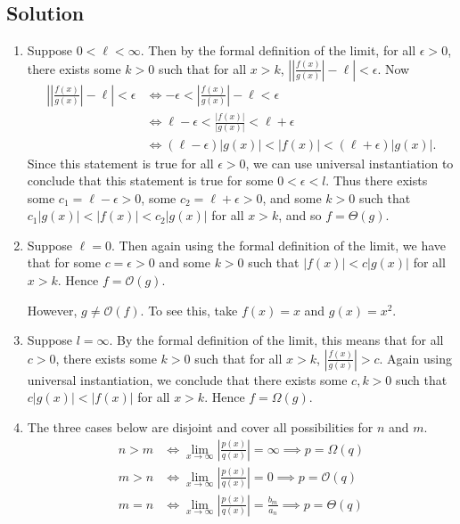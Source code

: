 \documentclass{article}
\begin{document}
\subsection*{Solution}
    \begin{enumerate}
        \item Suppose $0 < \ell < \infty$. Then by the formal definition of the limit, for all $\epsilon > 0$, there exists some $k > 0$ such that for all $x > k$, $\left|\left|\frac{f(x)}{g(x)}\right| - \ell\right| < \epsilon$. Now
        \begin{align*}
            \left|\left|\frac{f(x)}{g(x)}\right| - \ell\right| < \epsilon &\iff - \epsilon < \left|\frac{f(x)}{g(x)}\right| - \ell < \epsilon \\
            &\iff \ell - \epsilon < \frac{|f(x)|}{|g(x)|} < \ell + \epsilon \\
            &\iff (\ell - \epsilon)\left|g(x)\right| < \left|f(x)\right| < (\ell + \epsilon)\left|g(x)\right|.
        \end{align*}
        Since this statement is true for all $\epsilon > 0$, we can use universal instantiation to conclude that this statement is true for some $0 < \epsilon < l$. Thus there exists some $c_{1} = \ell - \epsilon > 0$, some $c_{2} = \ell + \epsilon > 0$, and some $k > 0$ such that $c_{1}|g(x)| < |f(x)| < c_{2}|g(x)|$ for all $x > k$, and so $f = \Theta(g)$.
        \item Suppose $\ell = 0$. Then again using the formal definition of the limit, we have that for some $c = \epsilon > 0$ and some $k > 0$ such that $|f(x)| < c|g(x)|$ for all $x > k$. Hence $f = \mathcal{O}(g)$.
        
        \vspace{1.5mm}
        However, $g \ne \mathcal{O}(f)$. To see this, take $f(x) = x$ and $g(x) = x^2$.
        \item Suppose $l = \infty$. By the formal definition of the limit, this means that for all $c > 0$, there exists some $k > 0$ such that for all $x > k$, $\left|\frac{f(x)}{g(x)}\right| > c$. Again using universal instantiation, we conclude that there exists some $c, k > 0$ such that $c|g(x)| < |f(x)|$ for all $x > k$. Hence $f = \Omega(g)$.
        \item The three cases below are disjoint and cover all possibilities for $n$ and $m$.
        \begin{align*}
            n > m &\iff \lim_{x \rightarrow \infty} \left|\frac{p(x)}{q(x)}\right| = \infty \implies p = \Omega(q) \\
            m > n &\iff \lim_{x \rightarrow \infty} \left|\frac{p(x)}{q(x)}\right| = 0 \implies p = \mathcal{O}(q) \\
            m = n &\iff \lim_{x \rightarrow \infty} \left|\frac{p(x)}{q(x)}\right| = \frac{b_{m}}{a_{n}} \implies p = \Theta(q)
        \end{align*}
    \end{enumerate}
\end{document}
